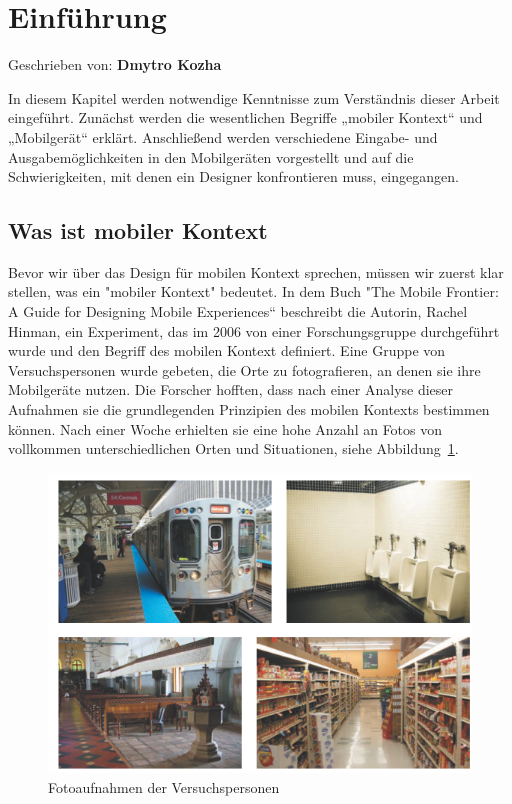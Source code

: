 
\section{Einführung}

Geschrieben von: \textbf{Dmytro Kozha}
\newline


In diesem Kapitel werden notwendige Kenntnisse zum Verständnis dieser Arbeit  eingeführt. Zunächst werden die wesentlichen Begriffe „mobiler Kontext“ und „Mobilgerät“ erklärt. Anschließend  werden verschiedene Eingabe- und Ausgabemöglichkeiten in den Mobilgeräten vorgestellt und auf die Schwierigkeiten, mit denen ein Designer konfrontieren muss, eingegangen.
\subsection{Was ist mobiler Kontext} %
\label{sub:was_ist_mobiler_kontext}
Bevor wir über das Design für mobilen Kontext sprechen, müssen wir zuerst klar stellen, was ein "mobiler Kontext" bedeutet. In dem Buch "The Mobile Frontier: A Guide for Designing Mobile Experiences“ beschreibt die Autorin, Rachel Hinman, ein Experiment, das im 2006 von einer Forschungsgruppe durchgeführt wurde und den Begriff des mobilen Kontext definiert. Eine Gruppe von Versuchspersonen wurde gebeten, die Orte zu fotografieren, an denen sie ihre Mobilgeräte nutzen. Die Forscher hofften, dass nach einer Analyse dieser Aufnahmen sie die grundlegenden Prinzipien des mobilen Kontexts bestimmen können. Nach einer Woche erhielten sie eine hohe Anzahl an Fotos von vollkommen unterschiedlichen Orten und Situationen, siehe Abbildung~\ref{fig:studie}.\cite{mobileFrontier}

 \begin{figure}[h]
 \centering
 \includegraphics[height=0.25\textheight]{img/studie.png}
 \caption{Fotoaufnahmen der Versuchspersonen}\label{fig:studie}
\end{figure}

